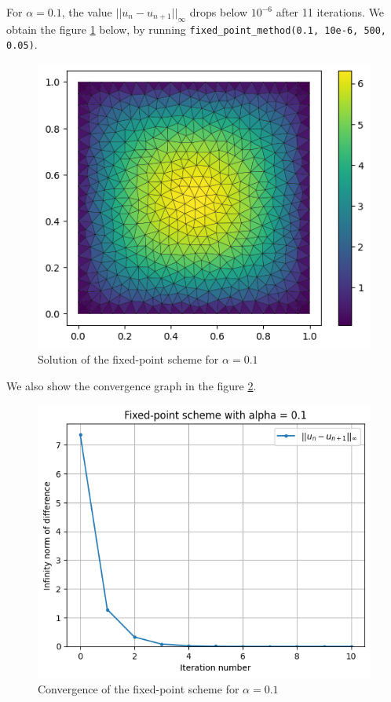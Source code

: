 \documentclass[11pt, a4paper, twoside]{article}
\begin{document}
For $\alpha=0.1$, the value $||u_n -u_{n+1}||_\infty$ drops below $10^{-6}$ after 11 iterations. We obtain the figure \ref{q2fig1} below, by running \verb+fixed_point_method(0.1, 10e-6, 500, 0.05)+.
\begin{figure}[H]
\centering
\includegraphics[scale = 0.7]{../Figures/fixed_sol_alpha0.1.png}
\caption{Solution of the fixed-point scheme for $\alpha=0.1$}
\label{q2fig1}
\end{figure}

We also show the convergence graph in the figure \ref{q2fig2}.
\begin{figure}[H]
\centering
\includegraphics[scale = 0.7]{../Figures/fixed_conv_alpha0.1.png}
\caption{Convergence of the fixed-point scheme for $\alpha=0.1$}
\label{q2fig2}
\end{figure}
\end{document}
